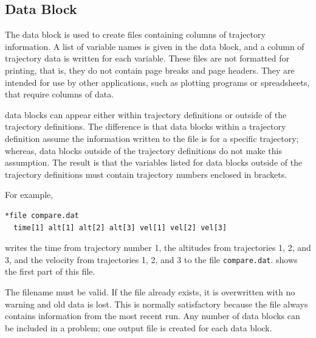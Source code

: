 \subsection{ Data Block}\label{sec:problem-block-file}

The  data block is used to create files containing columns of
trajectory information. A list of variable names is given in the data block, and a
column of trajectory data is written for each variable. These files are not formatted
for printing, that is, they do not contain page breaks and page headers. They are
intended for use by other applications, such as plotting programs or spreadsheets,
that require columns of data.

 data blocks can appear either within trajectory definitions or
outside of the trajectory definitions. The difference is that
 data blocks within a trajectory definition assume the
information written to the file is for a specific trajectory; whereas,
 data blocks outside of the trajectory definitions do not make
this assumption. The result is that the variables listed for
 data blocks outside of the trajectory definitions must contain
trajectory numbers enclosed in brackets.

For example,

\begin{lstlisting}[style=taosmanual]
*file compare.dat
  time[1] alt[1] alt[2] alt[3] vel[1] vel[2] vel[3]
\end{lstlisting}

writes the time from trajectory number 1, the altitudes from trajectories 1, 2, and 3,
and the velocity from trajectories 1, 2, and 3 to the file \texttt{compare.dat}.
 shows the first part of this file.

\begin{center}
  \begin{minipage}{0.96\linewidth}
    
    \label{fig:problem-output-file-example}
  \end{minipage}
\end{center}

The filename must be valid. If the file already exists, it is overwritten with no
warning and old data is lost. This is normally satisfactory because the file always
contains information from the most recent run. Any number of
 data blocks can be included in a problem; one output file is
created for each  data block.

